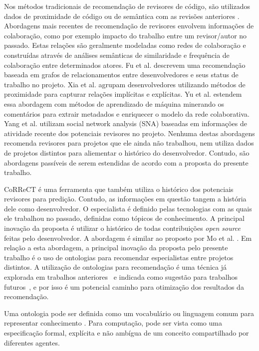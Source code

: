\documentclass[peerreview]{acmart}
\begin{document}
Nos métodos tradicionais de recomendação de revisores de código, são utilizados dados de proximidade de código ou de semântica com as revisões anteriores \cite{balachandran2013, jiang2015}. Abordagens mais recentes de recomendação de revisores envolvem informações de colaboração, como por exemplo impacto do trabalho entre um revisor/autor no passado. Estas relações são geralmente modeladas como redes de colaboração e construídas através de análises semânticas de similaridade e frequência de colaboração entre determinados atores. Fu et al. \cite{fu2017} descrevem uma recomendação baseada em grafos de relacionamentos entre desenvolvedores e seus status de trabalho no projeto. Xia et al. \cite{xia2017} agrupam desenvolvedores utilizando métodos de proximidade para capturar relações implícitas e explícitas. Yu et al. \cite{yu2014,yu2014-2} estendem essa abordagem com métodos de aprendizado de máquina minerando os comentários para extrair metadados e enriquecer o modelo da rede colaborativa. Yang et al. \cite{yang2016} utilizam social network analysis (SNA) baseadas em informações de atividade recente dos potenciais revisores no projeto. Nenhuma destas abordagens recomenda revisores para projetos que ele ainda não trabalhou, nem utiliza dados de projetos distintos para aliementar o histórico do desenvolvedor. Contudo, são abordagens passíveis de serem estendidas de acordo com a proposta do presente trabalho.

CoRReCT \cite{rahman2016} é uma ferramenta que também utiliza o histórico dos potenciais revisores para predição. Contudo, as informações em questão tangem a história dele como desenvolvedor. O especialista é definido pelas tecnologias com as quais ele trabalhou no passado, definidas como tópicos de conhecimento. A principal inovação da proposta é utilizar o histórico de todas contribuições \textit{open source} feitas pelo desenvolvedor. A abordagem é similar ao proposto por Mo et al. \cite{mo2015}. Em relação a esta abordagem, a principal inovação da proposta pelo presente trabalho é o uso de ontologias para recomendar especialistas entre projetos distintos. A utilização de ontologias para recomendação é uma técnica já explorada em trabalhos anteriores~\cite{middleton2001} e indicada como sugestão para trabalhos futuros~\cite{adomavicius2005}, e por isso é um potencial caminho para otimização dos resultados da recomendação.

Uma ontologia pode ser definida como um vocabulário ou linguagem comum para representar conhecimento \cite{guarino1998}. Para computação, pode ser vista como uma especificação formal, explícita e não ambígua de um conceito compartilhado por diferentes agentes.
\end{document}
